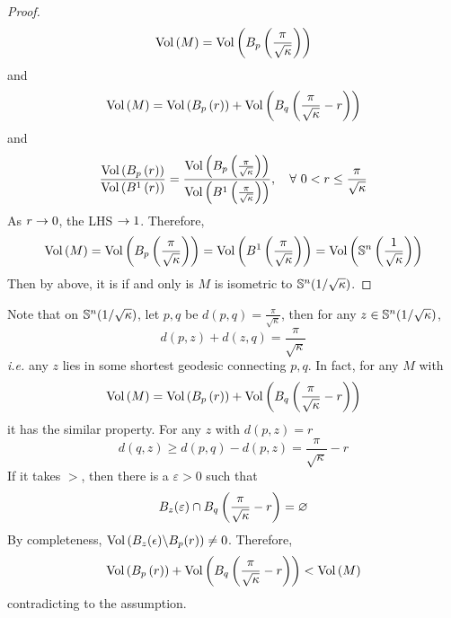 \begin{enumerate}[label=\arabic{*}]
\begin{proof}
		\begin{equation*}
			\operatorname{Vol}\left(M\right) = \operatorname{Vol}\left(B_p\left(\frac{\pi}{\sqrt{\kappa}}\right)\right)
		\end{equation*}
		and
		\begin{equation*}
			\operatorname{Vol}\left(M\right) = \operatorname{Vol}\left(B_p\left(r\right)\right)+ \operatorname{Vol}\left(B_q\left(\frac{\pi}{\sqrt{\kappa}}-r\right)\right)
		\end{equation*}
		and
		\begin{equation*}
			\frac{\operatorname{Vol}\left(B_p\left(r\right)\right)}{\operatorname{Vol}\left(B^1\left(r\right)\right)} = \frac{\operatorname{Vol}\left(B_p\left(\frac{\pi}{\sqrt{\kappa}}\right)\right)}{\operatorname{Vol}\left(B^1\left(\frac{\pi}{\sqrt{\kappa}}\right)\right)},\quad \forall~0< r \leq \frac{\pi}{\sqrt{\kappa}}
		\end{equation*}
		As $r \rightarrow 0$, the LHS $\rightarrow 1$. Therefore,
		\begin{equation*}
			\operatorname{Vol}\left(M\right) = \operatorname{Vol}\left(B_p\left(\frac{\pi}{\sqrt{\kappa}}\right)\right) = \operatorname{Vol}\left(B^1\left(\frac{\pi}{\sqrt{\kappa}}\right)\right) = \operatorname{Vol}\left(\mathbb{S}^n\left(\frac{1}{\sqrt{\kappa}}\right)\right)
		\end{equation*}
		Then by above, it is if and only is $M$ is isometric to $\mathbb{S}^n(1/\sqrt{\kappa})$.
	\end{proof}
	\begin{rmk}
		Note that on $\mathbb{S}^n(1/\sqrt{\kappa})$, let $p,q$ be $d(p,q) = \frac{\pi}{\sqrt{\kappa}}$, then for any $z \in \mathbb{S}^n(1/\sqrt{\kappa})$,
		\begin{equation*}
			d(p,z) + d(z,q) = \frac{\pi}{\sqrt{\kappa}}
		\end{equation*}
		\emph{i.e.} any $z$ lies in some shortest geodesic connecting $p,q$. In fact, for any $M$ with
		\begin{equation*}
			\operatorname{Vol}\left(M\right) = \operatorname{Vol}\left(B_p\left(r\right)\right)+ \operatorname{Vol}\left(B_q\left(\frac{\pi}{\sqrt{\kappa}}-r\right)\right)
		\end{equation*}
		it has the similar property. For any $z$ with $d(p,z) = r$
		\begin{equation*}
			d(q,z) \geq d(p,q) - d(p,z) = \frac{\pi}{\sqrt{\kappa}}-r
		\end{equation*}
		If it takes $>$, then there is a $\varepsilon > 0$ such that
		\begin{equation*}
			B_z(\varepsilon)\cap B_q\left(\frac{\pi}{\sqrt{\kappa}}-r\right) = \varnothing
		\end{equation*}
		By completeness, $\operatorname{Vol}\left(B_z(\epsilon) \backslash B_p(r)\right) \neq 0$. Therefore,
		\begin{equation*}
			 \operatorname{Vol}\left(B_p\left(r\right)\right)+ \operatorname{Vol}\left(B_q\left(\frac{\pi}{\sqrt{\kappa}}-r\right)\right) < \operatorname{Vol}\left(M\right)
		\end{equation*}
		contradicting to the assumption.
	\end{rmk}


\end{enumerate}
